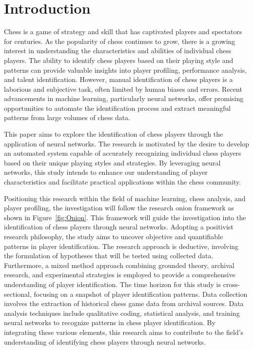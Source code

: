 
\chapter{Introduction}
\begin{spacing}{2.0}

Chess is a game of strategy and skill that has captivated players and spectators for centuries. As the popularity of chess continues to grow, there is a growing interest in understanding the characteristics and abilities of individual chess players. The ability to identify chess players based on their playing style and patterns can provide valuable insights into player profiling, performance analysis, and talent identification. However, manual identification of chess players is a laborious and subjective task, often limited by human biases and errors. Recent advancements in machine learning, particularly neural networks, offer promising opportunities to automate the identification process and extract meaningful patterns from large volumes of chess data.

This paper aims to explore the identification of chess players through the application of neural networks. The research is motivated by the desire to develop an automated system capable of accurately recognizing individual chess players based on their unique playing styles and strategies. By leveraging neural networks, this study intends to enhance our understanding of player characteristics and facilitate practical applications within the chess community.

Positioning this research within the field of machine learning, chess analysis, and player profiling, the investigation will follow the research onion framework as shown in Figure~\ref{fig:Onion}. This framework will guide the investigation into the identification of chess players through neural networks. Adopting a positivist research philosophy, the study aims to uncover objective and quantifiable patterns in player identification. The research approach is deductive, involving the formulation of hypotheses that will be tested using collected data. Furthermore, a mixed method approach combining grounded theory, archival research, and experimental strategies is employed to provide a comprehensive understanding of player identification. The time horizon for this study is cross-sectional, focusing on a snapshot of player identification patterns. Data collection involves the extraction of historical chess game data from archival sources. Data analysis techniques include qualitative coding, statistical analysis, and training neural networks to recognize patterns in chess player identification. By integrating these various elements, this research aims to contribute to the field's understanding of identifying chess players through neural networks.


\end{spacing}

